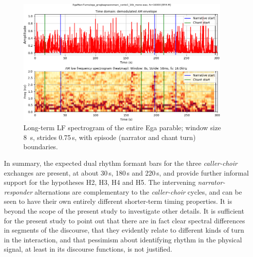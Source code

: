 \documentclass[output=paper,colorlinks,citecolor=brown]{langscibook}
\begin{document}
\begin{figure}
\includegraphics[trim={1.5cm 1cm 0 0}, clip, width=0.95\textwidth]{gibbon_figure08.png}
\caption{\label{fig:fig08}Long-term LF spectrogram of the entire Ega parable; window size 8 s, strides 0.75\,s, with episode (narrator and chant turn) boundaries.}
\end{figure}

In summary, the expected dual rhythm formant bars for the three \textit{caller-choir} exchanges are present, at about 30\,s, 180\,s and 220\,s, and provide further informal support for the hypotheses H2, H3, H4 and H5. The intervening \textit{narrator-responder} alternations are complementary to the \textit{caller-choir} cycles, and can be seen to have their own entirely different shorter-term timing properties. It is beyond the scope of the present study to investigate other details. It is sufficient for the present study to point out that there are in fact clear spectral differences in segments of the discourse, that they evidently relate to different kinds of turn in the interaction, and that pessimism about identifying rhythm in the physical signal, at least in its discourse functions, is not justified.
\end{document}
